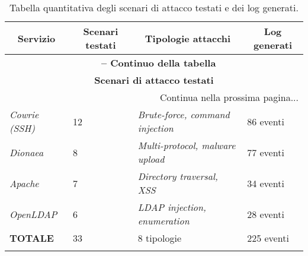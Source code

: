 \begin{center}
\begin{longtable}{|p{}|p{}|p{}|p{}|}
\hline
\multicolumn{1}{|c|}{\textbf{Servizio}} & 
\multicolumn{1}{c|}{\textbf{Scenari testati}} & 
\multicolumn{1}{c|}{\textbf{Tipologie attacchi}} & 
\multicolumn{1}{c|}{\textbf{Log generati}} \\ 
\hline
\endfirsthead

\multicolumn{4}{c}{{\bfseries \tablename\ \thetable{} -- Continuo della tabella}}\\
\hline
\multicolumn{4}{|c|}{\textbf{Scenari di attacco testati}} \\ \hline
\endhead

\hline \multicolumn{4}{|r|}{{Continua nella prossima pagina...}} \\ \hline
\endfoot

\endlastfoot

\textit{Cowrie (SSH)} & 12 & \textit{Brute-force, command injection} & 86 eventi \\ \hline
\textit{Dionaea} & 8 & \textit{Multi-protocol, malware upload} & 77 eventi \\ \hline
\textit{Apache} & 7 & \textit{Directory traversal, XSS} & 34 eventi \\ \hline
\textit{OpenLDAP} & 6 & \textit{LDAP injection, enumeration} & 28 eventi \\ \hline
\textbf{TOTALE} & 33 & 8 tipologie & 225 eventi \\ \hline

\caption{Tabella quantitativa degli scenari di attacco testati e dei log generati.}
\label{tab:scenari-attacco}
\end{longtable}
\end{center}


